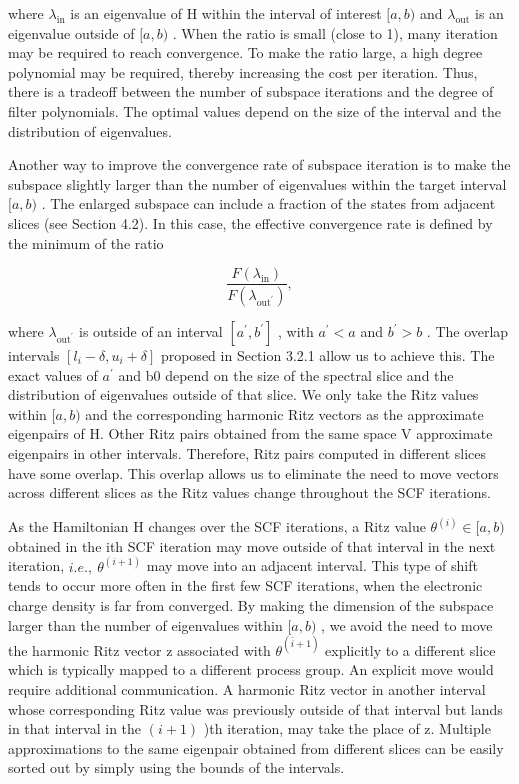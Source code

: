 \documentclass[
  10
]{article}
\begin{document}
where \(\lambda _ { \mathrm { i n } }\) is an eigenvalue of H within the
interval of interest \([ a , b )\) and
\(\lambda _ { \mathrm { o u t } }\) is an eigenvalue outside of
\([ a , b )\) . When the ratio is small (close to 1), many iteration may
be required to reach convergence. To make the ratio large, a high degree
polynomial may be required, thereby increasing the cost per iteration.
Thus, there is a tradeoff between the number of subspace iterations and
the degree of filter polynomials. The optimal values depend on the size
of the interval and the distribution of eigenvalues.

Another way to improve the convergence rate of subspace iteration is to
make the subspace slightly larger than the number of eigenvalues within
the target interval \([ a , b )\) . The enlarged subspace can include a
fraction of the states from adjacent slices (see Section 4.2). In this
case, the effective convergence rate is defined by the minimum of the
ratio

\[
\frac {F (\lambda_ {\mathrm{in}})}{F (\lambda_ {\mathrm {out^ {\prime}}})},
\]

where \(\lambda _ { \mathrm { o u t ^ { \prime } } }\) is outside of an
interval \([ a ^ { \prime } , b ^ { \prime } ]\) , with
\(a ^ { \prime } < a\) and \(b ^ { \prime } > b\) . The overlap
intervals \([ l _ { i } - \delta , u _ { i } + \delta ]\) proposed in
Section 3.2.1 allow us to achieve this. The exact values of
\(a ^ { \prime }\) and b0 depend on the size of the spectral slice and
the distribution of eigenvalues outside of that slice. We only take the
Ritz values within \([ a , b )\) and the corresponding harmonic Ritz
vectors as the approximate eigenpairs of H. Other Ritz pairs obtained
from the same space V approximate eigenpairs in other intervals.
Therefore, Ritz pairs computed in different slices have some overlap.
This overlap allows us to eliminate the need to move vectors across
different slices as the Ritz values change throughout the SCF
iterations.

As the Hamiltonian H changes over the SCF iterations, a Ritz value
\(\theta ^ { ( i ) } \in [ a , b )\) obtained in the ith SCF iteration
may move outside of that interval in the next iteration,
\(i . e . , \ \theta ^ { ( i + 1 ) }\) may move into an adjacent
interval. This type of shift tends to occur more often in the first few
SCF iterations, when the electronic charge density is far from
converged. By making the dimension of the subspace larger than the
number of eigenvalues within \([ a , b )\) , we avoid the need to move
the harmonic Ritz vector z associated with
\(\theta ^ { ( \bar { i } + 1 ) }\) explicitly to a different slice
which is typically mapped to a different process group. An explicit move
would require additional communication. A harmonic Ritz vector in
another interval whose corresponding Ritz value was previously outside
of that interval but lands in that interval in the \(( i + 1 )\) )th
iteration, may take the place of z. Multiple approximations to the same
eigenpair obtained from different slices can be easily sorted out by
simply using the bounds of the intervals.
\end{document}

